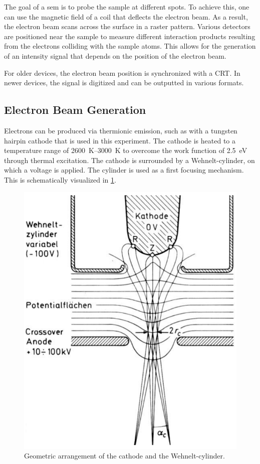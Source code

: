 The goal of a \ac{sem} is to probe the sample at different spots.
To achieve this, one can use the magnetic field of a coil that deflects
the electron beam.
As a result, the electron beam scans across the surface in a raster
pattern. Various detectors are positioned near the sample to measure
different interaction products resulting from the electrons colliding
with the sample atoms. This allows for the generation of an intensity
signal that depends on the position of the electron beam.

For older devices, the electron beam position is synchronized
with a CRT.
In newer devices, the signal is digitized and can be outputted in
various formats.

\subsection{Electron Beam Generation}
Electrons can be produced via thermionic emission, such as with a tungsten hairpin cathode that is used in this experiment.
The cathode is heated to a temperature range of
\qtyrange{2600}{3000}{\kelvin} to overcome the work function of
\qty{2.5}{\electronvolt} through thermal excitation.
The cathode is surrounded by a Wehnelt-cylinder, on which a voltage is
applied.
The cylinder is used as a first focusing mechanism.
This is schematically visualized in \cref{fig:wolfram}.
\begin{figure}
	\centering
	\includegraphics[width=0.95\linewidth]{../assets/wolfram.png}
	\caption{Geometric arrangement of the cathode and the Wehnelt-cylinder.
		}
	\label{fig:wolfram}
\end{figure}
